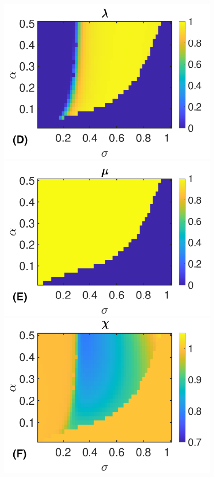 \documentclass[%
 reprint,
superscriptaddress,
 amsmath,amssymb,
 prl,
]{revtex4-2}
\begin{document}
\begin{figure}[b]
\includegraphics[scale=0.22]{fig1d-eps-converted-to.pdf}
\includegraphics[scale=0.22]{fig1e-eps-converted-to.pdf}
\includegraphics[scale=0.22]{fig1f-eps-converted-to.pdf}

\end{figure}
\end{document}
